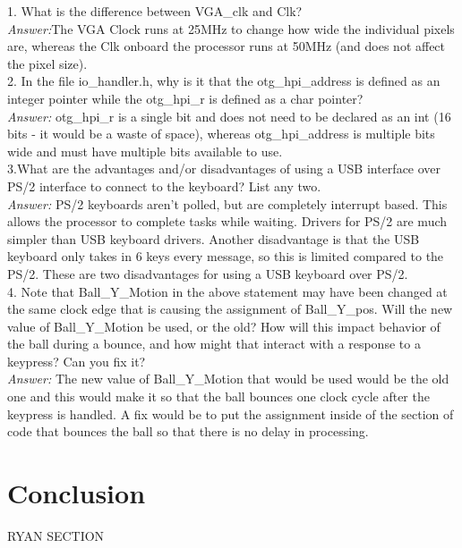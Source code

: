 \documentclass[journal, twocolumn, final,11pt,letterpaper]{IEEEtran}
\begin{document}
1. What is the difference between VGA\_clk and Clk? \\

\textit{Answer:}The VGA Clock runs at 25MHz to change how wide the individual pixels are, whereas the Clk onboard the processor runs at 50MHz (and does not affect the pixel size).\\

2. In the file io\_handler.h, why is it that the otg\_hpi\_address is defined as an integer pointer while the otg\_hpi\_r is defined as a char pointer? \\

\textit{Answer:} otg\_hpi\_r is a single bit and does not need to be declared as an int (16 bits - it would be a waste of space), whereas otg\_hpi\_address is multiple bits wide and must have multiple bits available to use.\\

3.What are the advantages and/or disadvantages of using a USB interface over PS/2 interface to connect to the keyboard? List any two. \\

\textit{Answer:} PS/2 keyboards aren't polled, but are completely interrupt based. This allows the processor to complete tasks while waiting. Drivers for PS/2 are much simpler than USB keyboard drivers. Another disadvantage is that the USB keyboard only takes in 6 keys every message, so this is limited compared to the PS/2. These are two disadvantages for using a USB keyboard over PS/2.\\

4.  Note that Ball\_Y\_Motion in the above statement may have been changed at the same clock edge that is causing the assignment of Ball\_Y\_pos.  Will the new value of Ball\_Y\_Motion be used, or the old?  How will this impact behavior of the ball during a bounce, and how might that interact with a response to a keypress?  Can you fix it?\\

\textit{Answer:} The new value of Ball\_Y\_Motion that would be used would be the old one and this would make it so that the ball bounces one clock cycle after the keypress is handled. A fix would be to put the assignment inside of the section of code that bounces the ball so that there is no delay in processing. \\

\section{Conclusion}
RYAN SECTION
\end{document}
